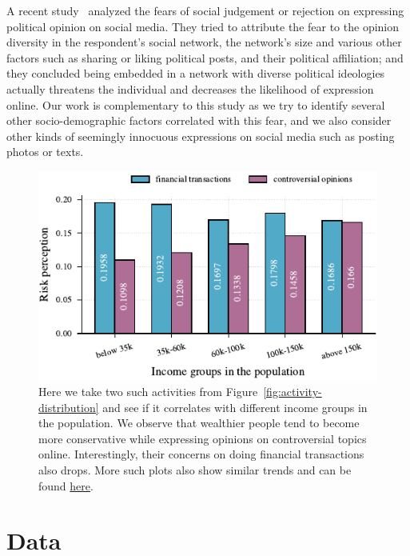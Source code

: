\documentclass{article}
\theoremstyle{plain}
\theoremstyle{definition}
\theoremstyle{remark}
\begin{document}
A recent study~\citep{weeks2024too} analyzed the fears of social judgement or rejection on expressing political opinion on social media. They tried to attribute the fear to the opinion diversity in the respondent's social network, the network's size and various other factors such as sharing or liking political posts, and their political affiliation; and they concluded being embedded in a network with diverse political ideologies actually threatens the individual and decreases the likelihood of expression online. Our work is complementary to this study as we try to identify several other socio-demographic factors correlated with this fear, and we also consider other kinds of seemingly innocuous expressions on social media such as posting photos or texts.

\begin{figure}[t]
\includegraphics{tex/figures/income_bar_2021.pdf}
    \caption{Here we take two such activities from Figure~\ref{fig:activity-distribution} and see if it correlates with different income groups in the population. We observe that wealthier people tend to become more conservative while expressing opinions on controversial topics online. Interestingly, their concerns on doing financial transactions also drops. More such plots also show similar trends and can be found \href{https://datalitproject1.streamlit.app/}{here}.}
    \label{fig:income-activity-distribution}
    \vspace{-.3cm}
\end{figure}


\section{Data}\label{sec:data}
\end{document}
